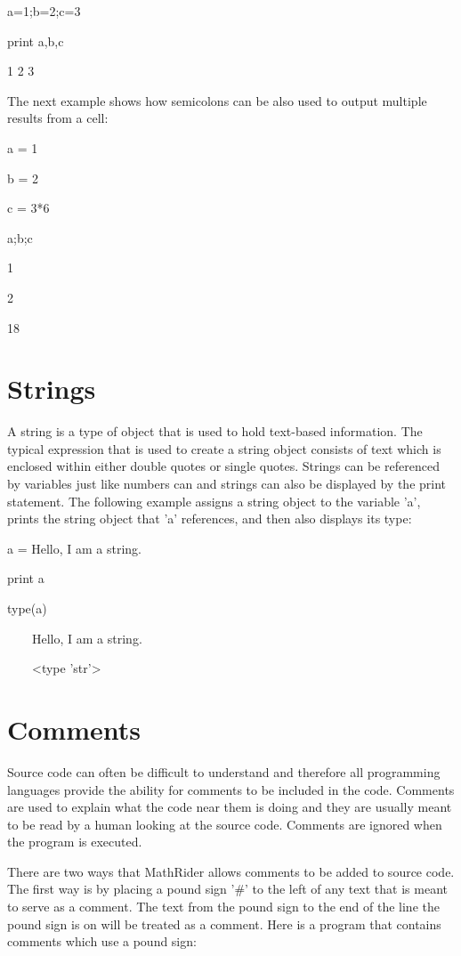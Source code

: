 \documentclass[12pt,oneside]{book}
\begin{document}
a=1;b=2;c=3

print a,b,c

{\textbar}

1 2 3

The next example shows how semicolons can be also used to output multiple results from a cell: 

a = 1

b = 2

c = 3*6

a;b;c

{\textbar}

1

2

18

\section[Strings]{Strings}
A string is a type of object that is used to hold text{}-based information. The typical expression that is used to create a string object consists of text which is enclosed within either double quotes or single quotes. Strings can be referenced by variables just like numbers can and strings can also be displayed by the print statement. The following example assigns a string object to the variable 'a', prints the string object that 'a' references, and then also displays its type: 

a = {\textquotedbl}Hello, I am a string.{\textquotedbl}

print a

type(a)

{\textbar}

\ \ \ \ Hello, I am a string.

\ \ \ \ {\textless}type
'str'{\textgreater}

\section[Comments]{Comments}

Source code can often be difficult to understand and therefore all programming languages provide the ability for comments to be included in the code. Comments are used to explain what the code near them is doing and they are usually meant to be read by a human looking at the source code. Comments are ignored when the program is executed. 

There are two ways that MathRider allows comments to be added to source code. The first way is by placing a pound sign '\#' to the left of any text that is meant to serve as a comment. The text from the pound sign to the end of the line the pound sign is on will be treated as a comment. Here is a program that contains comments which use a pound sign: 
\end{document}
